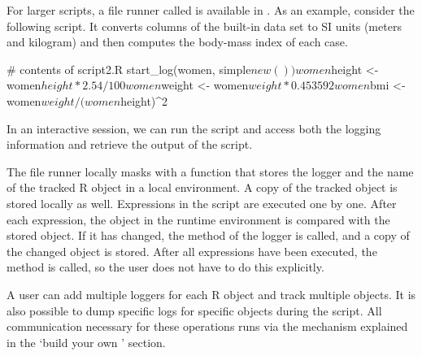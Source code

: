 For larger scripts, a file runner called  is available in
. As an example, consider the following script. It converts
columns of the built-in  data set to SI units (meters and kilogram)
and then computes the body-mass index of each case.
\begin{example}
  # contents of script2.R
  start_log(women, simple$new())
  women$height <- women$height * 2.54/100
  women$weight <- women$weight * 0.453592
  women$bmi    <- women$weight/(women$height)^2
\end{example}
In an interactive session, we can run the script and access both the logging
information and retrieve the output of the script.

The  file runner locally masks   with a
function that stores the logger and the name of the tracked R object in a local
environment. A copy of the tracked object is stored locally as well.
Expressions in the script are executed one by one. After each expression, the
object in the runtime environment is compared with the stored object.  If it
has changed, the  method of the logger is called, and a copy of the
changed object is stored. After all expressions have been executed, the
 method is called, so the user does not have to do this explicitly.

A user can add multiple loggers for each R object and track multiple objects.
It is also possible to dump specific logs for specific objects during the
script.  All communication necessary for these operations runs via the
mechanism explained in the `build your own ' section.



